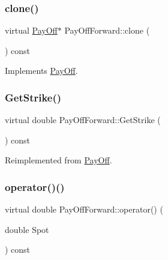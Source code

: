\subsubsection{\texorpdfstring{clone()}{clone()}}
{\footnotesize\ttfamily virtual \hyperlink{classPayOff}{Pay\+Off}$\ast$ Pay\+Off\+Forward\+::clone (\begin{DoxyParamCaption}{ }\end{DoxyParamCaption}) const\hspace{0.3cm}{\ttfamily [virtual]}}



Implements \hyperlink{classPayOff_ad8194d5b82247ae89c25c515f0ba806a}{Pay\+Off}.

\hypertarget{classPayOffForward_aa485cf251b7121a71396d3f107b35ff9}{}\label{classPayOffForward_aa485cf251b7121a71396d3f107b35ff9} 
\subsubsection{\texorpdfstring{Get\+Strike()}{GetStrike()}}
{\footnotesize\ttfamily virtual double Pay\+Off\+Forward\+::\+Get\+Strike (\begin{DoxyParamCaption}{ }\end{DoxyParamCaption}) const\hspace{0.3cm}{\ttfamily [virtual]}}



Reimplemented from \hyperlink{classPayOff_aa7a2451e286496c8d5a153000a818d34}{Pay\+Off}.

\hypertarget{classPayOffForward_a4b2921e71a9cb7eba5175c8f331061f8}{}\label{classPayOffForward_a4b2921e71a9cb7eba5175c8f331061f8} 
\subsubsection{\texorpdfstring{operator()()}{operator()()}}
{\footnotesize\ttfamily virtual double Pay\+Off\+Forward\+::operator() (\begin{DoxyParamCaption}\item[{double}]{Spot }\end{DoxyParamCaption}) const\hspace{0.3cm}{\ttfamily [virtual]}}



